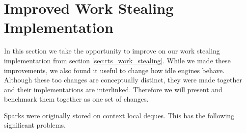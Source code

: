 
\section{Improved Work Stealing Implementation}
\label{sec:rts_work_stealing2}


In this section we take the opportunity to improve on our work stealing
implementation from section \ref{sec:rts_work_stealing}.
While we made these improvements,
we also found it useful to change how idle engines behave.
Although these too changes are conceptually distinct,
they were made together and their implementations are interlinked.
Therefore we will present and benchmark them together as one set of changes.

Sparks were originally stored on context local deques.
This has the following significant problems.

